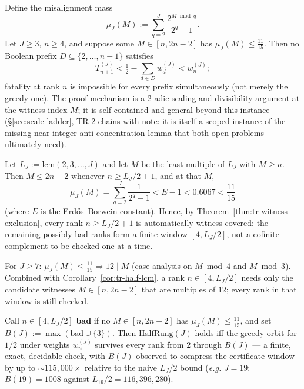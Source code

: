 \begin{thm}
\label{thm:tr-witness-exclusion}
Define the misalignment mass
$$\mu_J(M):=\sum_{q=2}^{J}\frac{2^{M\bmod q}}{2^q-1}.$$
Let $J\ge3$, $n\ge4$, and suppose some $M\in[n,2n-2]$ has $\mu_J(M)\le\tfrac{11}{15}$. Then no
Boolean prefix $D\subseteq\{2,\ldots,n-1\}$ satisfies
$$T_{n+1}^{(J)}<\tfrac12-\sum_{d\in D}w_d^{(J)}<w_n^{(J)};$$
fatality at rank $n$ is impossible for every prefix simultaneously (not merely the greedy one).
The proof mechanism is a 2-adic scaling and divisibility argument at the witness index $M$; it is
self-contained and general beyond this instance (\S\ref{sec:scale-ladder}, TR-2 chains-with note:
it is itself a scoped instance of the missing near-integer anti-concentration lemma that both open
problems ultimately need).
\end{thm}

\begin{cor}
\label{cor:tr-half-lcm}
Let $L_J:=\mathrm{lcm}(2,3,\ldots,J)$ and let $M$ be the least multiple of $L_J$ with $M\ge n$.
Then $M\le2n-2$ whenever $n\ge L_J/2+1$, and at that $M$,
$$\mu_J(M)=\sum_{q=2}^{J}\frac{1}{2^q-1}<E-1<0.6067<\frac{11}{15}$$
(where $E$ is the Erdős--Borwein constant). Hence, by Theorem~\ref{thm:tr-witness-exclusion}, every
rank $n\ge L_J/2+1$ is automatically witness-covered: the remaining possibly-bad ranks form a
finite window $[4,L_J/2]$, not a cofinite complement to be checked one at a time.
\end{cor}

\begin{lem}
\label{lem:tr-mod12}
For $J\ge7$: $\mu_J(M)\le\tfrac{11}{15}\Rightarrow 12\mid M$ (case analysis on $M\bmod4$ and
$M\bmod3$). Combined with Corollary~\ref{cor:tr-half-lcm}, a rank $n\in[4,L_J/2]$ needs only the
candidate witnesses $M\in[n,2n-2]$ that are multiples of $12$; every rank in that window is still
checked.
\end{lem}

\begin{thm}
\label{thm:tr-finite-decision}
Call $n\in[4,L_J/2]$ \textbf{bad} if no $M\in[n,2n-2]$ has $\mu_J(M)\le\tfrac{11}{15}$, and set
$B(J):=\max(\mathrm{bad}\cup\{3\})$. Then $\mathrm{HalfRung}(J)$ holds iff the greedy orbit for
$1/2$ under weights $w_n^{(J)}$ survives every rank from $2$ through $B(J)$ — a finite, exact,
decidable check, with $B(J)$ observed to compress the certificate window by up to $\sim115{,}000\times$
relative to the naive $L_J/2$ bound (\emph{e.g.} $J=19$: $B(19)=1008$ against $L_{19}/2=116{,}396{,}280$).
\end{thm}


